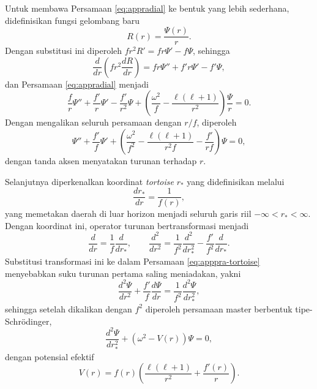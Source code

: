 Untuk membawa Persamaan \eqref{eq:appradial} ke bentuk yang lebih sederhana,
didefinisikan fungsi gelombang baru
\begin{equation}
    R(r) = \frac{\Psi(r)}{r}.
    \label{eq:appsubstitusi}
\end{equation}
Dengan substitusi ini diperoleh $f r^2 R' = f r \Psi' - f \Psi$, sehingga
\begin{equation}
    \frac{d}{dr} \left( f r^2 \frac{dR}{dr} \right)
    = f r \Psi'' + f' r \Psi' - f' \Psi,
\end{equation}
dan Persamaan \eqref{eq:appradial} menjadi
\begin{equation}
    \frac{f}{r} \Psi'' + \frac{f'}{r} \Psi' - \frac{f'}{r^2} \Psi
    + \left( \frac{\omega^2}{f} - \frac{\ell(\ell+1)}{r^2} \right) \frac{\Psi}{r} = 0.
\end{equation}
Dengan mengalikan seluruh persamaan dengan $r/f$, diperoleh
\begin{equation}
    \Psi'' + \frac{f'}{f} \Psi'
    + \left( \frac{\omega^2}{f^2} - \frac{\ell(\ell+1)}{r^2 f} - \frac{f'}{r f} \right) \Psi = 0,
    \label{eq:apppra-tortoise}
\end{equation}
dengan tanda aksen menyatakan turunan terhadap $r$.
 
Selanjutnya diperkenalkan koordinat \textit{tortoise} $r_*$ yang didefinisikan melalui
\begin{equation}
    \frac{dr_*}{dr} = \frac{1}{f(r)},
    \label{eq:apptortoise}
\end{equation}
yang memetakan daerah di luar horizon menjadi seluruh garis riil
$-\infty < r_* < \infty$. Dengan koordinat ini, operator turunan bertransformasi
menjadi
\begin{equation}
    \frac{d}{dr} = \frac{1}{f} \frac{d}{dr_*}, \qquad
    \frac{d^2}{dr^2} = \frac{1}{f^2} \frac{d^2}{dr_*^2} - \frac{f'}{f^2} \frac{d}{dr_*}.
\end{equation}
Substitusi transformasi ini ke dalam Persamaan \eqref{eq:apppra-tortoise} menyebabkan
suku turunan pertama saling meniadakan, yakni
\begin{equation}
    \frac{d^2 \Psi}{dr^2} + \frac{f'}{f} \frac{d\Psi}{dr}
    = \frac{1}{f^2} \frac{d^2 \Psi}{dr_*^2},
\end{equation}
sehingga setelah dikalikan dengan $f^2$ diperoleh persamaan master berbentuk
tipe-Schrödinger,
\begin{equation}
    \frac{d^2 \Psi}{dr_*^2} + \left( \omega^2 - V(r) \right) \Psi = 0,
    \label{eq:appmaster}
\end{equation}
dengan potensial efektif
\begin{equation}
    V(r) = f(r) \left( \frac{\ell(\ell+1)}{r^2} + \frac{f'(r)}{r} \right).
    \label{eq:apppotensial}
\end{equation}
 

